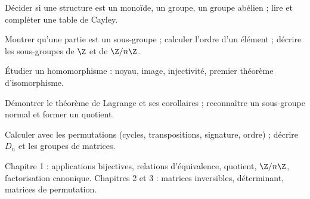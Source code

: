 \begin{objectifs}
\item Décider si une structure est un monoïde, un groupe, un groupe abélien ; lire et compléter une table de Cayley.
\item Montrer qu'une partie est un sous-groupe ; calculer l'ordre d'un élément ; décrire les sous-groupes de $\Z$ et de $\Z/n\Z$.
\item Étudier un homomorphisme : noyau, image, injectivité, premier théorème d'isomorphisme.
\item Démontrer le théorème de Lagrange et ses corollaires ; reconnaître un sous-groupe normal et former un quotient.
\item Calculer avec les permutations (cycles, transpositions, signature, ordre) ; décrire $D_n$ et les groupes de matrices.
\end{objectifs}
\begin{prerequis}
Chapitre 1 : applications bijectives, relations d'équivalence, quotient, $\Z/n\Z$, factorisation canonique. Chapitres 2 et 3 : matrices inversibles, déterminant, matrices de permutation.
\end{prerequis}


